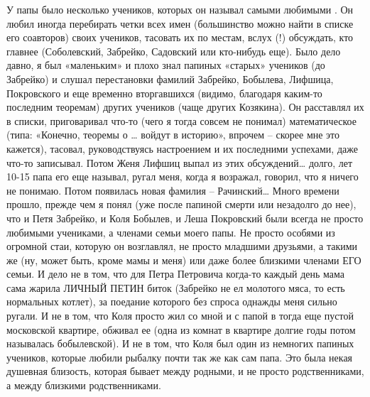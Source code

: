 У папы было несколько учеников, которых он называл самыми любимыми . Он любил иногда перебирать четки всех имен (большинство можно найти в списке его соавторов) своих учеников, тасовать их по местам, вслух (!) обсуждать, кто главнее (Соболевский, Забрейко, Садовский или кто-нибудь еще). Было дело давно, я был «маленьким» и плохо знал папиных «старых» учеников (до Забрейко) и слушал перестановки фамилий Забрейко, Бобылева, Лифшица, Покровского и еще временно вторгавшихся (видимо, благодаря каким-то последним теоремам) других учеников (чаще других Козякина). Он расставлял их в списки, приговаривал что-то (чего я тогда совсем не понимал) математическое (типа: «Конечно, теоремы о … войдут в историю», впрочем – скорее мне это кажется), тасовал, руководствуясь настроением и их последними успехами, даже что-то записывал. Потом Женя Лифшиц выпал из этих обсуждений… долго, лет 10-15 папа его еще называл, ругал меня, когда я возражал, говорил, что я ничего не понимаю. Потом появилась новая фамилия – Рачинский… Много времени прошло,  прежде  чем  я  понял  (уже после папиной смерти или незадолго до нее), что и Петя Забрейко, и Коля Бобылев, и Леша Покровский были всегда не просто любимыми учениками, а членами семьи моего папы. Не просто особями из огромной стаи, которую он возглавлял, не просто младшими друзьями, а такими же (ну, может быть, кроме мамы и меня) или даже более близкими членами ЕГО семьи. И дело не в том, что для Петра Петровича когда-то каждый день мама сама жарила ЛИЧНЫЙ ПЕТИН биток (Забрейко не ел молотого мяса, то есть нормальных котлет), за поедание которого без спроса однажды меня сильно ругали. И не в том, что Коля просто жил со мной и с папой в тогда еще пустой московской квартире, обживал ее (одна из комнат в квартире долгие годы потом называлась бобылевской). И не в том, что Коля был один из немногих папиных учеников, которые любили рыбалку почти так же как сам папа. Это была некая душевная близость, которая бывает между родными, и не просто родственниками, а между близкими родственниками.

